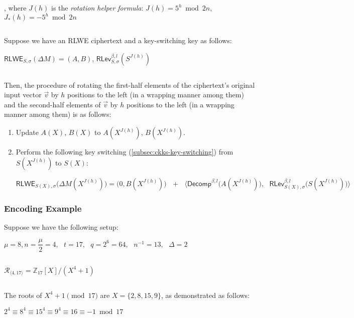 \begin{tcolorbox}[title={\textbf{\tboxlabel{\ref*{subsec:bfv-rotation}} BFV's Homomorphic Rotation of Input Vector Slots}}]
$ $

$ $


, where $J(h)$ is the \textit{rotation helper formula}: $J(h) = 5^h \bmod 2n$, \text{ } $J_*(h) = -5^h \bmod 2n$

$ $

Suppose we have an RLWE ciphertext and a key-switching key as follows:

$\textsf{RLWE}_{S, \sigma}(\Delta M) = (A, B)$, \text{ } $\textsf{RLev}_{S, \sigma}^{\beta, l}(S^{J(h)})$

$ $

Then, the procedure of rotating the first-half elements of the ciphertext's original input vector $\vec{v}$ by $h$ positions to the left (in a wrapping manner among them) and the second-half elements of $\vec{v}$ by $h$ positions to the left (in a wrapping manner among them) is as follows: 

\begin{enumerate}
\item Update $A(X)$, $B(X)$ to $A(X^{J(h)})$, $B(X^{J(h)})$. 
\item Perform the following key switching (\autoref{subsec:ckks-key-switching}) from $S(X^{J(h)})$ to $S(X)$:

$\textsf{RLWE}_{S(X),\sigma}\bm{(}\Delta M(X^{J(h)})\bm{)} = \bm{(} 0, B(X^{J(h)}) \bm{)} \text{ } + \text{ } \bm{\langle}  \textsf{Decomp}^{\beta, l}\bm{(}A(X^{J(h)})\bm{)}, \text{ } \textsf{RLev}_{S(X), \sigma}^{\beta, l}\bm{(}S(X^{J(h)})\bm{)} \bm{\rangle}$
\end{enumerate}


\end{tcolorbox}


\subsubsection{Encoding Example}
\label{subsubsec:bfv-batch-encoding-ex}

Suppose we have the following setup: 

$\mu = 8, n = \dfrac{\mu}{2} = 4, \text{ } t = 17, \text{ } q = 2^6 = 64, \text{ } n^{-1} = 13, \text{ } \Delta = 2$

$ $

$\mathcal{R}_{\langle 4, 17 \rangle} = \mathbb{Z}_{17}[X] / (X^4 + 1)$

$ $

The roots of $X^4 + 1 \pmod{17}$ are $X = \{2, 8, 15, 9\}$, as demonstrated as follows:

$2^4 \equiv 8^4 \equiv 15^4 \equiv 9^4 \equiv 16 \equiv -1 \bmod{17}$

